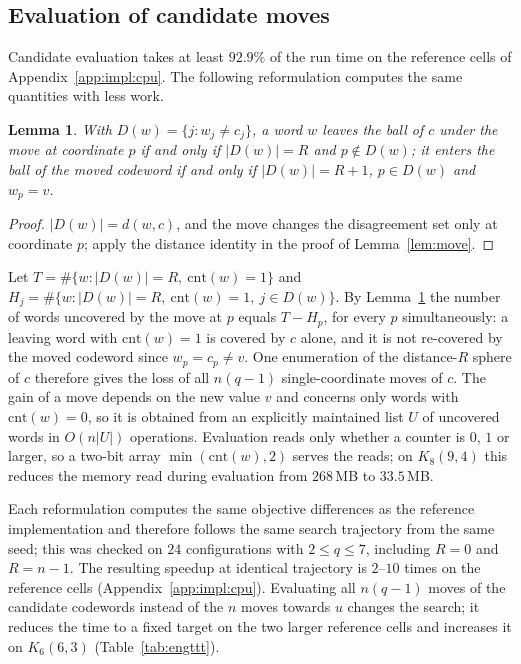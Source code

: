 \documentclass[11pt]{amsart}
\newtheorem{lemma}[theorem]{Lemma}
\newcommand{\Kq}[3]{K_{#1}(#2,#3)}
\begin{document}
\subsection{Evaluation of candidate moves}\label{sec:ls:eval}

Candidate evaluation takes at least $92.9\%$ of the run time on the
reference cells of Appendix~\ref{app:impl:cpu}. The following
reformulation computes the same quantities with less work.

\begin{lemma}\label{lem:shared}
With $D(w)=\{j: w_j\neq c_j\}$, a word $w$ leaves the ball of $c$ under
the move at coordinate $p$ if and only if $|D(w)|=R$ and $p\notin D(w)$;
it enters the ball of the moved codeword if and only if $|D(w)|=R+1$,
$p\in D(w)$ and $w_p=v$.
\end{lemma}

\begin{proof}
$|D(w)|=d(w,c)$, and the move changes the disagreement set only at
coordinate $p$; apply the distance identity in the proof of
Lemma~\ref{lem:move}.
\end{proof}

Let $T=\#\{w: |D(w)|=R,\ \mathrm{cnt}(w)=1\}$ and
$H_j=\#\{w: |D(w)|=R,\ \mathrm{cnt}(w)=1,\ j\in D(w)\}$. By
Lemma~\ref{lem:shared} the number of words uncovered by the move at $p$
equals $T-H_p$, for every $p$ simultaneously: a leaving word with
$\mathrm{cnt}(w)=1$ is covered by $c$ alone, and it is not re-covered by
the moved codeword since $w_p=c_p\ne v$. One enumeration of the
distance-$R$ sphere of $c$ therefore gives the loss of all $n(q-1)$
single-coordinate moves of $c$. The gain of a move depends on the new
value $v$ and concerns only words with $\mathrm{cnt}(w)=0$, so it is
obtained from an explicitly maintained list $U$ of uncovered words in
$O(n|U|)$ operations. Evaluation reads only whether a counter is $0$, $1$
or larger, so a two-bit array $\min(\mathrm{cnt}(w),2)$ serves the reads;
on $\Kq{8}{9}{4}$ this reduces the memory read during evaluation from
$268$\,MB to $33.5$\,MB.

Each reformulation computes the same objective differences as the
reference implementation and therefore follows the same search trajectory
from the same seed; this was checked on $24$ configurations with $2\le
q\le 7$, including $R=0$ and $R=n-1$. The resulting speedup at identical
trajectory is $2$--$10$ times on the reference cells
(Appendix~\ref{app:impl:cpu}). Evaluating all $n(q-1)$ moves of the
candidate codewords instead of the $n$ moves towards $u$ changes the
search; it reduces the time to a fixed target on the two larger reference
cells and increases it on $\Kq{6}{6}{3}$ (Table~\ref{tab:engttt}).
\end{document}
